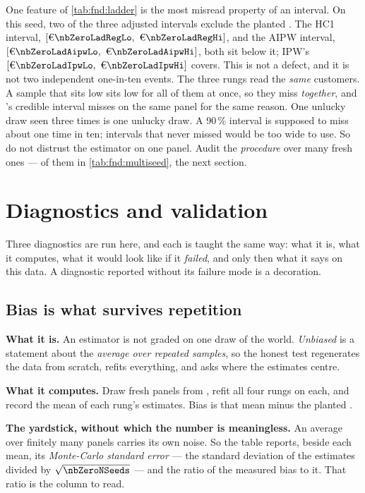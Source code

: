 One feature of \cref{tab:fnd:ladder} is the most misread property of an interval. On this seed,
two of the three adjusted intervals exclude the planted \eur{\nbZeroTrueDag}. The HC1 interval,
$[\eur{\nbZeroLadRegLo},\ \eur{\nbZeroLadRegHi}]$, and the AIPW interval,
$[\eur{\nbZeroLadAipwLo},\ \eur{\nbZeroLadAipwHi}]$, both sit below it; IPW's
$[\eur{\nbZeroLadIpwLo},\ \eur{\nbZeroLadIpwHi}]$ covers. This is not a defect, and it is not two
independent one-in-ten events. The three rungs read the \emph{same} \nbZeroNCustomers{}
customers. A sample that sits low sits low for all of them at once, so they miss \emph{together},
and 's credible interval misses on the same panel for the same reason. One unlucky
draw seen three times is one unlucky draw. A 90\,\% interval is supposed to miss about one time
in ten; intervals that never missed would be too wide to use. So do not distrust the estimator on
one panel. Audit the \emph{procedure} over many fresh ones --- \nbZeroNSeeds{} of them in
\cref{tab:fnd:multiseed}, the next section.

\section{Diagnostics and validation}
\label{sec:fnd:valid}

Three diagnostics are run here, and each is taught the same way: what it is, what it computes,
what it would look like if it \emph{failed}, and only then what it says on this data. A
diagnostic reported without its failure mode is a decoration.

\subsection*{Bias is what survives repetition}

\textbf{What it is.} An estimator is not graded on one draw of the world. \emph{Unbiased} is a
statement about the \emph{average over repeated samples}, so the honest test regenerates the
data from scratch, refits everything, and asks where the estimates centre.

\textbf{What it computes.} Draw \nbZeroNSeeds{} fresh panels from
, refit all four rungs on each, and record the mean of each
rung's estimates. Bias is that mean minus the planted \eur{\nbZeroTrueDag}.

\textbf{The yardstick, without which the number is meaningless.} An average over finitely many
panels carries its own noise. So the table reports, beside each mean, its \emph{Monte-Carlo
standard error} --- the standard deviation of the estimates divided by $\sqrt{\nbZeroNSeeds}$ ---
and the ratio of the measured bias to it. That ratio is the column to read.

